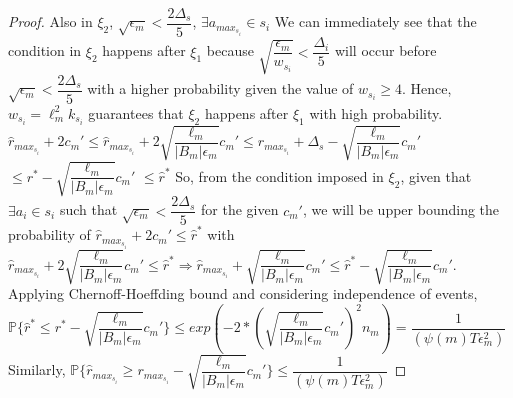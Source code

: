 \begin{proof}
\newline Also in $\xi_{2}$, $\sqrt{\epsilon_{m}}<\dfrac{2\Delta_{s}}{5}$, $\exists a_{max_{s_{i}}}\in s_{i}$
\newline We can immediately see that the condition in $\xi_{2}$ happens after $\xi_{1}$ because $\sqrt{\dfrac{\epsilon_{m}}{w_{s_{i}}}}<\dfrac{\Delta_{i}}{5}$ will occur before $\sqrt{\epsilon_{m}}<\dfrac{2\Delta_{s}}{5}$ with a higher probability given the value of $w_{s_{i}}\geq 4$. Hence, $w_{s_{i}}=\ell_{m}^{2}k_{s_{i}}$ guarantees that $\xi_{2}$ happens after $\xi_{1}$ with high probability.
\newline
$\hat{r}_{max_{s_{i}}} + 2c_{m}'\leq\hat{r}_{max_{s_{i}}} + 2\sqrt{\dfrac{\ell_{m}}{|B_{m}|\epsilon_{m}}}c_{m}'\leq r_{max_{s_{i}}} + \Delta_{s}-\sqrt{\dfrac{\ell_{m}}{|B_{m}|\epsilon_{m}}}c_{m}'$
\newline\hspace*{14em}$\leq r^{*}-\sqrt{\dfrac{\ell_{m}}{|B_{m}|\epsilon_{m}}}c_{m}'$
\newline\hspace*{14em}$\leq \hat{r}^{*}$
\newline
So, from the condition imposed in $\xi_{2}$, given that $\exists a_{i}\in s_{i}$ such that $\sqrt{\epsilon_{m}}<\dfrac{2\Delta_{s}}{5}$ for the given $c_{m}'$, we will be upper bounding the probability of $\hat{r}_{max_{s_{i}}} + 2c_{m}'\leq\hat{r}^{*}$ with $\hat{r}_{max_{s_{i}}} + 2\sqrt{\dfrac{\ell_{m}}{|B_{m}|\epsilon_{m}}}c_{m}'\leq \hat{r}^{*}\Rightarrow\hat{r}_{max_{s_{i}}} + \sqrt{\dfrac{\ell_{m}}{|B_{m}|\epsilon_{m}}}c_{m}'\leq \hat{r}^{*}-\sqrt{\dfrac{\ell_{m}}{|B_{m}|\epsilon_{m}}}c_{m}'$.
\newline
Applying Chernoff-Hoeffding bound and considering independence of events,
\newline
$\mathbb{P}\lbrace\hat{r}^{*}\leq r^{*} - \sqrt{\dfrac{\ell_{m}}{|B_{m}|\epsilon_{m}}}c_{m}'\rbrace\leq exp(-2*(\sqrt{\dfrac{\ell_{m}}{|B_{m}|\epsilon_{m}}}c_{m}')^{2}n_{m})=\dfrac{1}{ (\psi(m)T\epsilon_{m}^{2})}$
\newline
Similarly, $\mathbb{P}\lbrace\hat{r}_{max_{s_{i}}}\geq r_{max_{s_{i}}} - \sqrt{\dfrac{\ell_{m}}{|B_{m}|\epsilon_{m}}}c_{m}'\rbrace\leq\dfrac{1}{ (\psi(m)T\epsilon_{m}^{2})}$

\end{proof}
